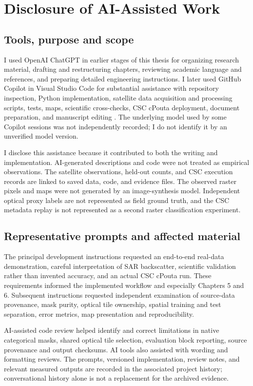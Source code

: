 \chapter{Disclosure of AI-Assisted Work}

\section{Tools, purpose and scope}

I used OpenAI ChatGPT in earlier stages of this thesis for organizing research
material, drafting and restructuring chapters, reviewing academic language and
references, and preparing detailed engineering instructions. I later used GitHub
Copilot in Visual Studio Code for substantial assistance with repository inspection, Python
implementation, satellite data acquisition and processing scripts, tests, maps,
scientific cross-checks, CSC cPouta deployment, document preparation, and
manuscript editing \citep{openai-chatgpt,copilot}. The underlying model used by
some Copilot sessions was not independently recorded; I do not identify it by an
unverified model version.

I disclose this assistance because it contributed to both the writing and
implementation. AI-generated descriptions and code were not treated as
empirical observations. The satellite observations, held-out counts, and CSC
execution records are linked to saved data, code, and evidence files. The
observed raster pixels and maps were not generated by an image-synthesis
model. Independent optical proxy labels are not represented as field ground
truth, and the CSC metadata replay is not represented as a second raster
classification experiment.

\section{Representative prompts and affected material}

The principal development instructions requested an end-to-end real-data
demonstration, careful interpretation of SAR backscatter, scientific validation
rather than invented accuracy, and an actual CSC cPouta run. These
requirements informed the implemented workflow and especially Chapters 5
and 6. Subsequent instructions requested independent examination of
source-data provenance, mask purity, optical tile ownership, spatial training
and test separation, error metrics, map presentation and reproducibility.

AI-assisted code review helped identify and correct limitations in native
categorical masks, shared optical tile selection, evaluation block reporting,
source provenance and output checksums. AI tools also assisted with wording
and formatting reviews. The prompts, versioned implementation, review notes,
and relevant measured outputs are recorded in the associated project
history; conversational history alone is not a replacement for the archived
evidence.

